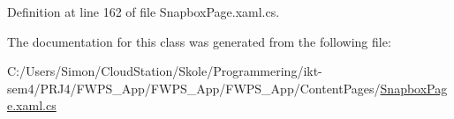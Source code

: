 Definition at line 162 of file Snapbox\+Page.\+xaml.\+cs.



The documentation for this class was generated from the following file\+:\begin{DoxyCompactItemize}
\item 
C\+:/\+Users/\+Simon/\+Cloud\+Station/\+Skole/\+Programmering/ikt-\/sem4/\+P\+R\+J4/\+F\+W\+P\+S\+\_\+\+App/\+F\+W\+P\+S\+\_\+\+App/\+F\+W\+P\+S\+\_\+\+App/\+Content\+Pages/\mbox{\hyperlink{_snapbox_page_8xaml_8cs}{Snapbox\+Page.\+xaml.\+cs}}\end{DoxyCompactItemize}
